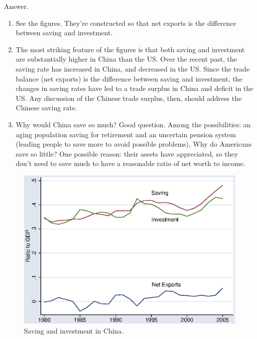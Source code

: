 \documentclass[letterpaper,12pt]{article}
\begin{document}
\begin{enumerate}
Answer.  
\begin{enumerate}
\item See the figures.  They're constructed so that net exports
is the difference between saving and investment.  

\item The most striking feature of the figures is that 
both saving and investment are substantially higher in China than the US.
Over the recent past, the saving rate has increased in China, 
and decreased in the US.
Since the trade balance (net exports) is the difference 
between saving and investment, 
the changes in saving rates have led to 
a trade surplus in China and deficit in the US.
Any discussion of the Chinese trade surplus, then, should address the 
Chinese saving rate.   
\item Why would China save so much?  
Good question.
Among the possibilities:  
an aging population saving for retirement and  
an uncertain pension system (leading people to save more to avoid possible
problems), 
Why do Americans save so little?  
One possible reason:  their assets have appreciated, so they 
don't need to save much to have a reasonable ratio of net worth 
to income.  
\end{enumerate}


\begin{figure}
    \centering
    \includegraphics[scale=0.8]{chnflows.eps}
    \caption{Saving and investment in China.}
    \label{fig:chn}%
\end{figure}


\end{enumerate}
\end{document}
